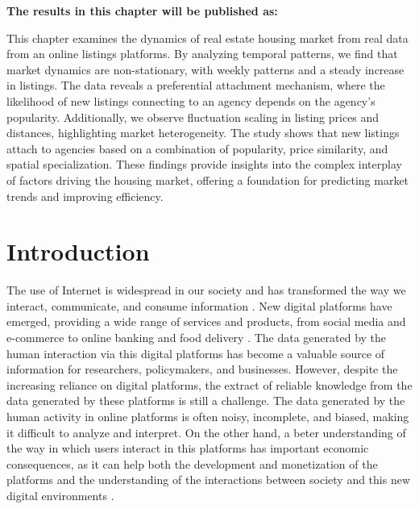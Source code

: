\vspace{-1.5cm}
\small
\textbf{The results in this chapter will be published as:}
\vspace{0.05 cm}

\normalsize
\vspace{0.5 cm}

This chapter examines the dynamics of real estate housing market from real data from an online listings platforms. By analyzing temporal patterns, we find that market dynamics are non-stationary, with weekly patterns and a steady increase in listings. The data reveals a preferential attachment mechanism, where the likelihood of new listings connecting to an agency depends on the agency's popularity. Additionally, we observe fluctuation scaling in listing prices and distances, highlighting market heterogeneity. The study shows that new listings attach to agencies based on a combination of popularity, price similarity, and spatial specialization. These findings provide insights into the complex interplay of factors driving the housing market, offering a foundation for predicting market trends and improving efficiency.

\section{Introduction}

The use of Internet is widespread in our society and has transformed the way we interact, communicate, and consume information \cite{berners-lee-2006,dorogovtsev2002evolution,pastor-satorras-2004,watts-2007}. New digital platforms have emerged, providing a wide range of services and products, from social media and e-commerce to online banking and food delivery \cite{unknown-author-2013}. The data generated by the human interaction via this digital platforms has become a valuable source of information for researchers, policymakers, and businesses. However, despite the increasing reliance on digital platforms, the extract of reliable knowledge from the data generated by these platforms is still a challenge. The data generated by the human activity in online platforms is often noisy, incomplete, and biased, making it difficult to analyze and interpret. On the other hand, a beter understanding of the way in which users interact in this platforms has important economic consequences, as it can help both the development and monetization of the platforms and the understanding of the interactions between society and this new digital environments \cite{choudary-2016}.

